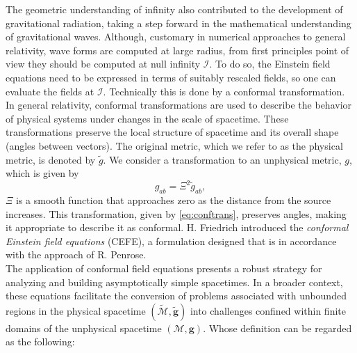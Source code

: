 The geometric understanding of infinity also contributed to the development of gravitational radiation, taking a step forward in the mathematical understanding of gravitational waves. Although, customary in numerical approaches to general relativity, wave forms are computed at large radius, from first principles point of view they should be computed at null infinity $\mathscr{I}$. To do so, the Einstein field equations need to be expressed in terms of suitably rescaled fields, so one can evaluate the fields at $\mathscr{I}$. Technically this is done by a conformal transformation. In general relativity, conformal transformations are used to describe the behavior of physical systems under changes in the scale of spacetime. These transformations preserve the local structure of spacetime and its overall shape (angles between vectors). The original metric, which we refer to as the physical metric, is denoted by $\tilde{g}$. We consider a transformation to an unphysical metric, $g$, which is given by 
\begin{equation}\label{eq:conftrans}
	g_{ab} = \Xi^2 \tilde{g}_{ab},
\end{equation}
$\Xi$ is a smooth function that approaches zero as the distance from the source increases. This transformation, given by \eqref{eq:conftrans}, preserves angles, making it appropriate to describe it as conformal. H. Friedrich introduced the \textit{conformal Einstein field
equations} (CEFE), a formulation designed that is in accordance with
the approach of R. Penrose.\\
\noindent
The application of conformal field equations presents a robust strategy for analyzing and building asymptotically simple spacetimes. In a broader context, these equations facilitate the conversion of problems associated with unbounded regions in the physical spacetime $(\tilde{\mathcal{M}}, \boldsymbol{\tilde{g}})$ into challenges confined within finite domains of the unphysical spacetime $({\mathcal{M}},\boldsymbol{g})$. Whose definition can be regarded as the following: \\
